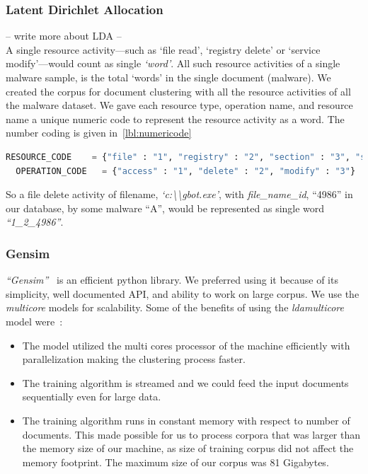 \subsubsection{Latent Dirichlet Allocation}
\label{ssub:Latent Dirichlet Allocation}
-- write more about LDA --\\
A single resource activity---such as `file read', `registry delete' or `service modify'---would count as single \emph{`word'}.
All such resource activities of a single malware sample, is the total `words' in the single document (malware).
We created the corpus for document clustering with all the resource activities of all the malware dataset.
We gave each resource type, operation name, and resource name a unique numeric code to represent the resource activity as a word.
The number coding is given in~\autoref{lbl:numericode}
\begin{lstlisting}[numbers=none,language=python,caption={Numeric codes given to resource and operation},label={lbl:numericode}]
  RESOURCE_CODE    = {"file" : "1", "registry" : "2", "section" : "3", "service" : "4", "driver" : "5", "sync" : "6", "process" : "7", "job" : "8"}
  OPERATION_CODE   = {"access" : "1", "delete" : "2", "modify" : "3"}
\end{lstlisting}
So a file delete activity of filename, \textit{`c:\textbackslash\textbackslash{}gbot.exe'}, with \textit{file\_name\_id}, ``4986'' in our database, by some malware ``A'', would be represented as single word \emph{``1\_2\_4986''}.
\subsubsection{Gensim}
\label{ssub:Gensim}
\emph{``Gensim''}~\cite[]{gensim} is an efficient python library.
We preferred using it because of its simplicity, well documented API, and ability to work on large corpus.
We use the \emph{multicore}\cite[]{ldamulticore}  models for scalability.
Some of the benefits of using the \emph{ldamulticore} model were~\cite[]{ldamulticore}:
\begin{itemize}
\item The model utilized the multi cores processor of the machine efficiently with parallelization making the clustering process faster.
\item The training algorithm is streamed and we could feed the input documents sequentially even for large data.
\item The training algorithm runs in constant memory with respect to number of documents.
This made possible for us to process corpora that was larger than the memory size of our machine, as size of training corpus did not affect the memory footprint.
The maximum size of our corpus was 81 Gigabytes.

\end{itemize}
